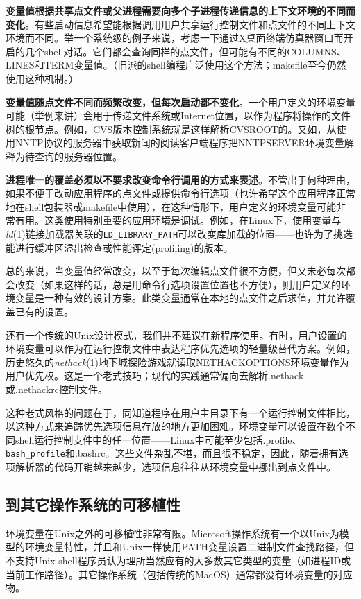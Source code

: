 \documentclass[12pt,oneside]{book}
\begin{document}
\textbf{变量值根据共享点文件或父进程需要向多个子进程传递信息的上下文环境的不同而变化}。有些启动信息希望能根据调用用户共享运行控制文件和点文件的不同上下文环境而不同。举一个系统级的例子来说，考虑一下通过X桌面终端仿真器窗口而开启的几个shell对话。它们都会查询同样的点文件，但可能有不同的COLUMNS、LINES和TERM变量值。（旧派的shell编程广泛使用这个方法；makefile至今仍然使用这种机制。）

\textbf{变量值随点文件不同而频繁改变，但每次启动都不变化}。一个用户定义的环境变量可能（举例来讲）会用于传递文件系统或Internet位置，以作为程序将操作的文件树的根节点。例如，CVS版本控制系统就是这样解析CVSROOT的。又如，从使用NNTP协议的服务器中获取新闻的阅读客户端程序把NNTPSERVER环境变量解释为待查询的服务器位置。

\textbf{进程唯一的覆盖必须以不要求改变命令行调用的方式来表述}。不管出于何种理由，如果不便于改动应用程序的点文件或提供命令行选项（也许希望这个应用程序正常地在shell包装器或makefile中使用），在这种情形下，用户定义的环境变量可能非常有用。这类使用特别重要的应用环境是调试。例如，在Linux下，使用变量与\textit{ld}(1)链接加载器关联的\verb+LD_LIBRARY_PATH+可以改变库加载的位置——也许为了挑选能进行缓冲区溢出检查或性能评定(profiling)的版本。

总的来说，当变量值经常改变，以至于每次编辑点文件很不方便，但又未必每次都会改变（如果这样的话，总是用命令行选项设置位置也不方便），则用户定义的环境变量是一种有效的设计方案。此类变量通常在本地的点文件之后求值，并允许覆盖已有的设置。

还有一个传统的Unix设计模式，我们并不建议在新程序使用。有时，用户设置的环境变量可以作为在运行控制文件中表达程序优先选项的轻量级替代方案。例如，历史悠久的\textit{nethack}(1)地下城探险游戏就读取NETHACKOPTIONS环境变量作为用户优先权。这是一个老式技巧；现代的实践通常偏向去解析.nethack或.nethackrc控制文件。

这种老式风格的问题在于，同知道程序在用户主目录下有一个运行控制文件相比，以这种方式来追踪优先选项信息存放的地方更加困难。环境变量可以设置在数个不同shell运行控制支件中的任一位置——Linux中可能至少包括.profile、\verb+bash_profile+和.bashrc。这些文件杂乱不堪，而且很不稳定，因此，随着拥有选项解析器的代码开销越来越少，选项信息往往从环境变量中挪出到点文件中。

\subsection{到其它操作系统的可移植性}
环境变量在Unix之外的可移植性非常有限。Microsoft操作系统有一个以Unix为模型的环境变量特性，并且和Unix一样使用PATH变量设置二进制文件查找路径，但不支持Unix shell程序员认为理所当然应有的大多数其它类型的变量（如进程ID或当前工作路径）。其它操作系统（包括传统的MacOS）通常都没有环境变量的对应物。
\end{document}
